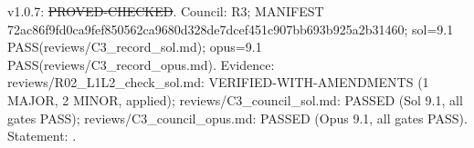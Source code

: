 \begin{lemma}\label{reg:W2-APP_POST}
\end{lemma}
\begin{statusbox}
 v1.0.7: \st{PROVED-CHECKED}. Council: R3; MANIFEST 72ac86f9fd0ca9fef850562ca9680d328de7dcef451c907bb693b925a2b31460; sol=9.1 PASS(reviews/C3\_record\_sol.md); opus=9.1 PASS(reviews/C3\_record\_opus.md). Evidence: reviews/R02\_L1L2\_check\_sol.md: VERIFIED-WITH-AMENDMENTS (1 MAJOR, 2 MINOR, applied); reviews/C3\_council\_sol.md: PASSED (Sol 9.1, all gates PASS); reviews/C3\_council\_opus.md: PASSED (Opus 9.1, all gates PASS). Statement: .
\end{statusbox}
